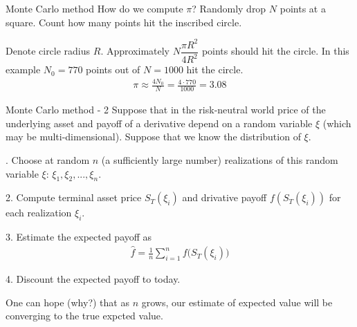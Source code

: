 \documentclass{beamer}
\begin{document}
\begin{frame}{Monte Carlo method}
\justify
How do we compute $\pi$? Randomly drop $N$ points at a square. Count how many points hit the inscribed circle.

\centering
{}
\justify
Denote circle radius $R$. Approximately $N\dfrac{\pi R^2}{4R^2}$ points should hit the circle. In this example $N_0=770$ points out of $N=1000$ hit the circle. 
\begin{align*}
\pi \approx \frac{4N_0}{N} = \frac{4 \cdot 770}{1000} = 3.08
\end{align*}
\end{frame}



\begin{frame}{Monte Carlo method - 2}
\justify
Suppose that in the risk-neutral world price of the underlying asset and payoff of a derivative depend on a random variable $\xi$ (which may be multi-dimensional). Suppose that we know the distribution of $\xi$.

. Choose at random $n$ (a sufficiently large number) realizations of this random variable $\xi$: $\xi_1, \xi_2, ..., \xi_n$.

2.  Compute terminal asset price $S_T(\xi_i)$ and drivative payoff $f(S_T(\xi_i))$ for each realization $\xi_i$.

3. Estimate the expected payoff as
\begin{align*}
\hat{f} = \frac{1}{n}\sum\limits_{i=1}^{n}f\Big(S_T(\xi_i)\Big)
\end{align*}

4. Discount the expected payoff to today.

\justify
One can hope (why?) that as $n$ grows, our estimate of expected value will be converging to the true expcted value.
\end{frame}
\end{document}
